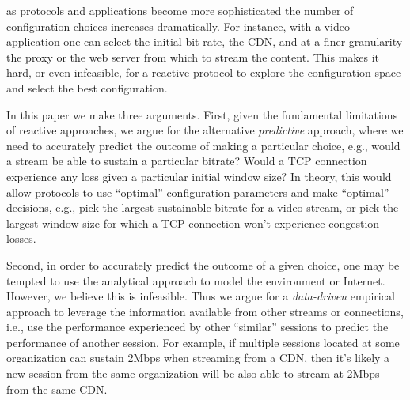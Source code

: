  as protocols and applications become more sophisticated the number of configuration choices increases dramatically. For instance, with a video application one can select the initial bit-rate, the CDN, and at a finer granularity the proxy or the web server from which to stream the content. This makes it hard, or even infeasible, for a reactive protocol to explore the configuration space and select the best configuration.



In this paper we make three arguments. First, given the fundamental limitations of reactive approaches, we argue for the alternative \emph{predictive} approach, where we need to accurately predict the outcome of making a particular choice, e.g., would a stream be able to sustain a particular bitrate? Would a TCP connection experience any loss given a particular initial window size? In theory, this would allow protocols to use ``optimal'' configuration parameters and make ``optimal'' decisions, e.g., pick the largest sustainable bitrate for a video stream,  or pick the largest window size for which a TCP connection won't experience congestion losses.

Second, in order to accurately predict the outcome of a given choice, one may be tempted to use the analytical approach to model the environment or Internet. However, we believe this is infeasible. Thus we argue for a \emph{data-driven} empirical approach to leverage the information available from other streams or connections, i.e., use the performance experienced by other ``similar'' sessions to predict the performance of another session. For example, if multiple sessions located at some organization can sustain 2Mbps when streaming from a CDN, then it's likely a new session from the same organization will be also able to stream at 2Mbps from the same CDN.

